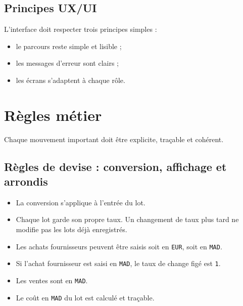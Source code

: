 \documentclass[11pt,a4paper]{scrreprt}
\newcommand{\code}[1]{\texttt{#1}}
\begin{document}
\section{Principes UX/UI}
L'interface doit respecter trois principes simples :
\begin{itemize}
  \item le parcours reste simple et lisible ;
  \item les messages d'erreur sont clairs ;
  \item les écrans s'adaptent à chaque rôle.
\end{itemize}

\chapter{Règles métier}

\begin{businessrulebox}[Règle d'or]
 Chaque mouvement important doit être explicite, traçable et cohérent.
\end{businessrulebox}

\section{Règles de devise : conversion, affichage et arrondis}
\begin{businessrulebox}
\begin{itemize}
  \item La conversion s'applique à l'entrée du lot.
  \item Chaque lot garde son propre taux. Un changement de taux plus tard ne modifie pas les lots déjà enregistrés.
  \item Les achats fournisseurs peuvent être saisis soit en \code{EUR}, soit en \code{MAD}.
  \item Si l'achat fournisseur est saisi en \code{MAD}, le taux de change figé est \code{1}.
  \item Les ventes sont en \code{MAD}.
  \item Le coût en \code{MAD} du lot est calculé et traçable.
\end{itemize}
\end{businessrulebox}
\end{document}
